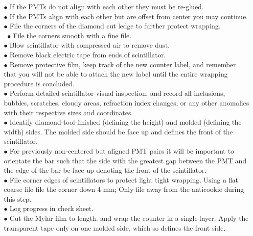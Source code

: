  $\bullet$ If the PMTs do not align with each other they must be re-glued.\\
 $\bullet$ If the PMTs align with each other but are offset from center you may
continue.\\
$\bullet$ File the corners of the diamond cut ledge to further protect wrapping.\\\
$\bullet$ File the corners smooth with a fine file.\\
$\bullet$ Blow scintillator with compressed air to remove dust.\\
$\bullet$ Remove black electric tape from ends of scintillator.\\
$\bullet$ Remove protective film, keep track of the new counter label, and remember that
you will not be able to attach the new label until the entire wrapping procedure
is concluded.\\
$\bullet$ Perform detailed scintillator visual inspection, and record all inclusions,
bubbles, scratches, cloudy areas, refraction index changes, or any other
anomalies with their respective sizes and coordinates.\\
$\bullet$ Identify diamond-tool-finished (defining the height) and molded (defining the
width) sides. The molded side should be face up and defines the front of the
scintillator.\\
 $\bullet$ For previously non-centered but aligned PMT pairs it will be important to
orientate the bar such that the side with the greatest gap between the PMT and
the edge of the bar be face up denoting the front of the scintillator.\\
$\bullet$ File corner edges of scintillators to protect light tight wrapping. Using a flat
coarse file file the corner down 4 mm; Only file away from the anticookie
during this step.\\
$\bullet$ Log progress in check sheet.\\
$\bullet$ Cut the Mylar film to length, and wrap the counter in a single layer. Apply the
transparent tape only on one molded side, which so defines the front side.\\

